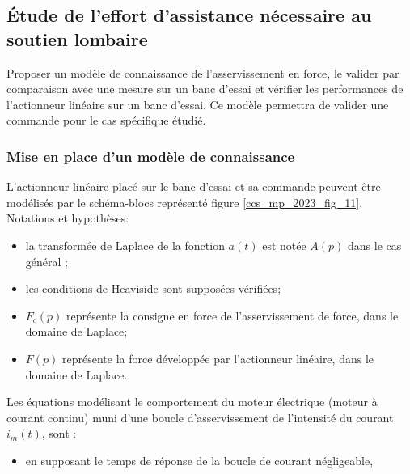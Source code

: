 \subsection{Étude de l'effort d'assistance nécessaire au soutien lombaire}%
\begin{obj}
Proposer un modèle de connaissance de l'asservissement en force, le valider par comparaison avec une mesure sur un banc d'essai et vérifier les performances de l'actionneur linéaire sur un banc d'essai. Ce modèle permettra de valider une commande pour le cas spécifique étudié.
\end{obj}


\subsubsection{Mise en place d'un modèle de connaissance}%

L'actionneur linéaire placé sur le banc d'essai et sa commande peuvent être modélisés par le schéma-blocs représenté figure \ref{ccs_mp_2023_fig_11}.\\
Notations et hypothèses:

\begin{itemize}
  \item la transformée de Laplace de la fonction $a(t)$ est notée $A(p)$ dans le cas général ;
  \item les conditions de Heaviside sont supposées vérifiées;
  \item $F_{c}(p)$ représente la consigne en force de l'asservissement de force, dans le domaine de Laplace;
  \item $F(p)$ représente la force développée par l'actionneur linéaire, dans le domaine de Laplace.
\end{itemize}

Les équations modélisant le comportement du moteur électrique (moteur à courant continu) muni d'une boucle d'asservissement de l'intensité du courant $i_{m}(t)$, sont :

\begin{itemize}
  \item en supposant le temps de réponse de la boucle de courant négligeable,
\end{itemize}

